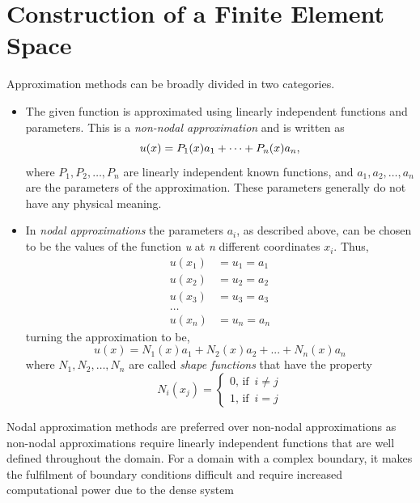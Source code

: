\section{Construction of a Finite Element Space}
Approximation methods can be broadly divided in two categories.
\begin{itemize}
    \item The given function is approximated using linearly independent functions and parameters. This is a
     \emph{non-nodal approximation} and is written as
     \begin{equation}
        u(x) = P_{1}(x) a_{1} + \dots + P_{n}(x) a_{n}, \notag
     \end{equation}
     where $P_{1}, P_{2},\dots, P_{n}$ are linearly independent known functions, 
     and $a_{1}, a_{2},\dots, a_{n}$ are the parameters of the approximation. These parameters generally do not have any physical meaning.
    \item In \emph{nodal approximations} the parameters $a_{i}$, as described above, can be chosen to be the values of the function \emph{u} at \emph{n} different coordinates $x_{i}$. Thus,
    \begin{align*}
        u(x_{1}) &= u_{1} = a_{1}\\
        u(x_{2}) &= u_{2} = a_{2}\\
        u(x_{3}) &= u_{3} = a_{3}\\
        \dots \\
        u(x_{n}) &= u_{n} = a_{n}
    \end{align*}   
    turning the approximation to be, 
    \begin{equation*}
        u(x) = N_{1}(x) a_{1} + N_{2}(x) a_{2} + ... + N_{n}(x) a_{n}
    \end{equation*}
    where $N_{1}, N_{2},\dots, N_{n}$ are called \emph{shape functions} that have the property
    \begin{equation*}
        N_{i}(x_{j}) = \begin{cases}
            0 \text{, if } \, i \neq j\\
            1 \text{, if } \, i = j
        \end{cases}
    \end{equation*}
\end{itemize}
Nodal approximation methods are preferred over non-nodal approximations as non-nodal approximations require
 linearly independent functions that are well defined throughout the domain. For a domain with a complex boundary,
 it makes the fulfilment of boundary conditions difficult and require increased computational power due to the dense system
